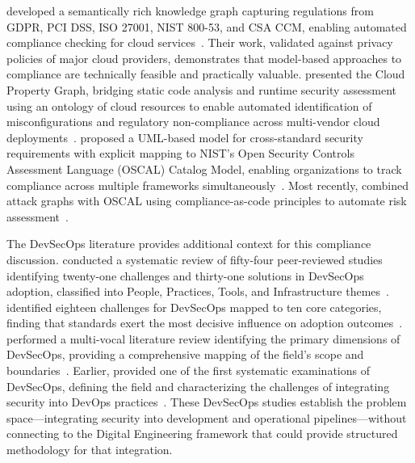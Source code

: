 \citeauthor{Joshi_Elluri_2020} developed a semantically rich knowledge graph capturing regulations from GDPR, PCI DSS, ISO 27001, NIST 800-53, and CSA CCM, enabling automated compliance checking for cloud services~\parencite{Joshi_Elluri_2020}. Their work, validated against privacy policies of major cloud providers, demonstrates that model-based approaches to compliance are technically feasible and practically valuable. \citeauthor{Banse_2021} presented the Cloud Property Graph, bridging static code analysis and runtime security assessment using an ontology of cloud resources to enable automated identification of misconfigurations and regulatory non-compliance across multi-vendor cloud deployments~\parencite{Banse_2021}. \citeauthor{Stojkov_2021} proposed a UML-based model for cross-standard security requirements with explicit mapping to NIST's Open Security Controls Assessment Language (OSCAL) Catalog Model, enabling organizations to track compliance across multiple frameworks simultaneously~\parencite{Stojkov_2021}. Most recently, \citeauthor{Koufos_2025} combined attack graphs with OSCAL using compliance-as-code principles to automate risk assessment~\parencite{Koufos_2025}.

The DevSecOps literature provides additional context for this compliance discussion. \citeauthor{Rajapakse_2022} conducted a systematic review of fifty-four peer-reviewed studies identifying twenty-one challenges and thirty-one solutions in DevSecOps adoption, classified into People, Practices, Tools, and Infrastructure themes~\parencite{Rajapakse_2022}. \citeauthor{Akbar_2022} identified eighteen challenges for DevSecOps mapped to ten core categories, finding that standards exert the most decisive influence on adoption outcomes~\parencite{Akbar_2022}. \citeauthor{Zhao_2024} performed a multi-vocal literature review identifying the primary dimensions of DevSecOps, providing a comprehensive mapping of the field's scope and boundaries~\parencite{Zhao_2024}. Earlier, \citeauthor{Myrbakken_2017} provided one of the first systematic examinations of DevSecOps, defining the field and characterizing the challenges of integrating security into DevOps practices~\parencite{Myrbakken_2017}. These DevSecOps studies establish the problem space---integrating security into development and operational pipelines---without connecting to the Digital Engineering framework that could provide structured methodology for that integration.

